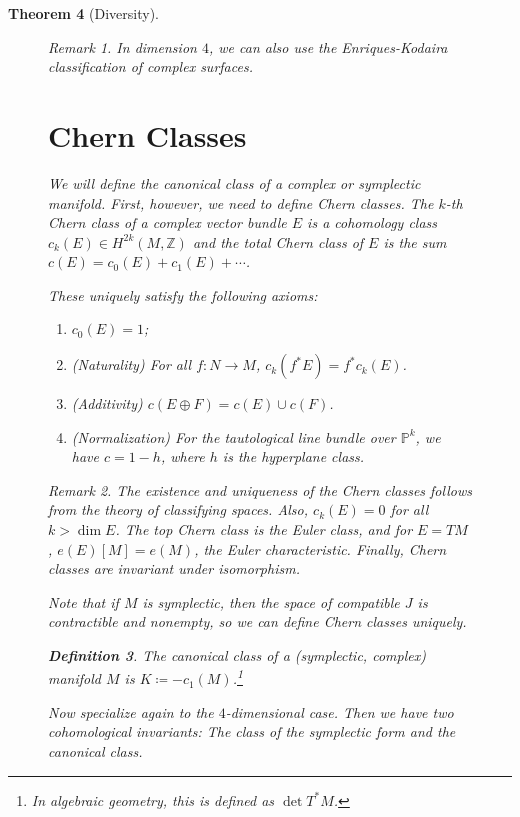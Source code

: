 \documentclass[leqno, openany]{memoir}
\newtheorem{thm}{Theorem}[chapter]
\theoremstyle{definition}
\newtheorem{defn}[thm]{Definition}
\theoremstyle{remark}
\newtheorem{rmk}[thm]{Remark}
\theoremstyle{plain}
\theoremstyle{definition}
\theoremstyle{remark}
\newcommand{\Z}{\mathbb{Z}}
\renewcommand{\P}{\mathbb{P}}
\begin{document}
\begin{thm}[Diversity]
\begin{figure}[H]
\begin{rmk} In dimension $4$, we can also use the Enriques-Kodaira
classification of complex surfaces.  \end{rmk}

\section{Chern Classes}%

We will define the canonical class of a complex or symplectic manifold. First,
however, we need to define Chern classes. The $k$-th \textit{Chern class} of a
complex vector bundle $E$ is a cohomology class $c_k(E) \in H^{2k}(M, \Z)$ and
the total Chern class of $E$ is the sum $c(E) = c_0(E) + c_1(E) + \cdots$.

These uniquely satisfy the following axioms: \begin{enumerate} \item $c_0(E) =
    1$; \item (Naturality) For all $f:N \to M$, $c_k(f^*E) = f^*c_k(E)$.  \item
    (Additivity) $c(E \oplus F) = c(E) \cup c(F)$.  \item (Normalization) For
    the tautological line bundle over $\P^k$, we have $c = 1 - h$, where $h$ is
    the hyperplane class.  \end{enumerate}

\begin{rmk} The existence and uniqueness of the Chern classes follows from the
    theory of classifying spaces. Also, $c_k(E) = 0$ for all $k > \dim E$. The
    top Chern class is the Euler class, and for $E = TM$, $e(E)[M] = e(M)$, the
    Euler characteristic. Finally, Chern classes are invariant under
    isomorphism.  \end{rmk}

Note that if $M$ is symplectic, then the space of compatible $J$ is
contractible and nonempty, so we can define Chern classes uniquely.

\begin{defn} The \textit{canonical class} of a (symplectic, complex) manifold
$M$ is $K \coloneqq - c_1(M)$.\footnote{In algebraic geometry, this is defined
as $\det T^*M$.} \end{defn}

Now specialize again to the $4$-dimensional case. Then we have two
cohomological invariants: The class of the symplectic form and the canonical
class.


\end{figure}
\end{thm}
\end{document}
